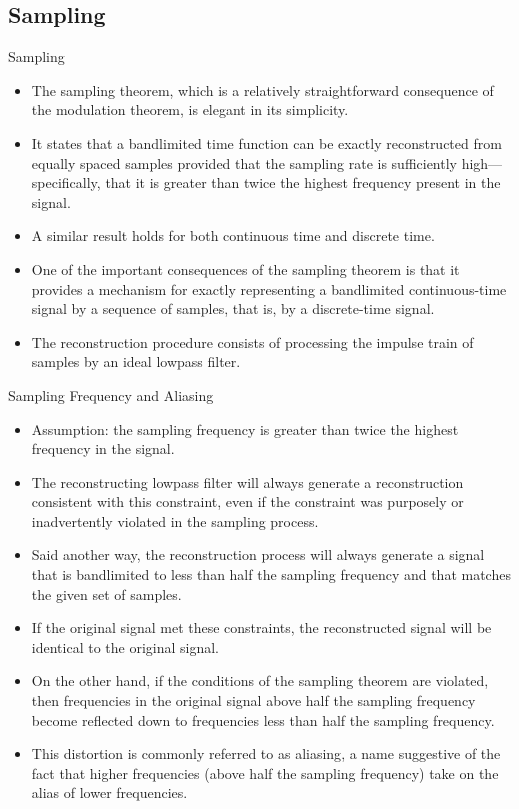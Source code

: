 \subsection{Sampling}
\begin{frame}{Sampling}
    \begin{itemize}
        \item The sampling theorem, which is a relatively straightforward consequence of
the modulation theorem, is elegant in its simplicity.
        \item It states that a bandlimited time function can be exactly reconstructed from equally spaced samples provided that the sampling rate is sufficiently high---specifically, that it is greater than twice the highest frequency present in the signal.
        \item A similar result holds for both continuous time and discrete time.
        \item One of the important consequences of the sampling theorem is that it provides a mechanism for exactly representing a bandlimited continuous-time signal by a sequence of samples, that is, by a discrete-time signal.
        \item The reconstruction procedure consists of processing the impulse train of samples by an ideal lowpass filter.
    \end{itemize}
\end{frame}


\begin{frame}{Sampling Frequency and Aliasing}
    \begin{itemize}
        \item Assumption: the sampling frequency is greater than twice the highest frequency in the signal.
        \item The reconstructing lowpass filter will always generate a reconstruction consistent with this constraint, even if the constraint was purposely or inadvertently violated in the sampling process.
    \item Said another way, the reconstruction process will always generate a signal that is bandlimited to less than half the sampling frequency
and that matches the given set of samples.
    \item If the original signal met these constraints, the reconstructed signal will be identical to the original signal.
    \item On the other hand, if the conditions of the sampling theorem are violated, then frequencies in the original signal above half the sampling frequency become reflected down to frequencies less than half the sampling frequency.
    \item This distortion is commonly referred to as \alert{aliasing}, a name suggestive of the fact that higher frequencies (above half the sampling frequency) take on the alias of lower frequencies.
    \end{itemize}
\end{frame}

